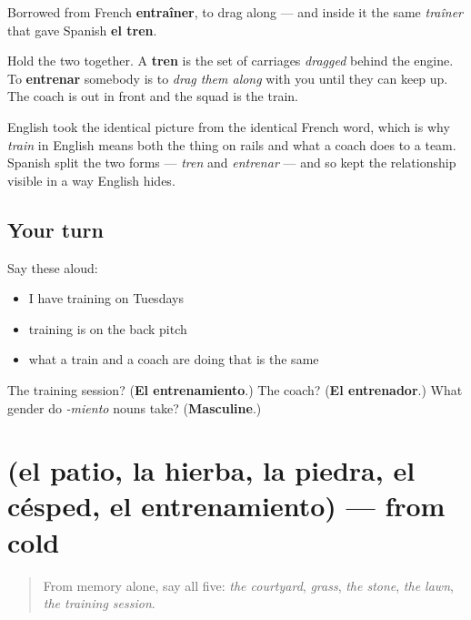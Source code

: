 \begin{cousinweb}
Borrowed from French \textbf{entraîner}, to drag along — and inside it the same \emph{traîner} that gave Spanish \textbf{el tren}.

Hold the two together. A \textbf{tren} is the set of carriages \emph{dragged} behind the engine. To \textbf{entrenar} somebody is to \emph{drag them along} with you until they can keep up. The coach is out in front and the squad is the train.

English took the identical picture from the identical French word, which is why \emph{train} in English means both the thing on rails and what a coach does to a team. Spanish split the two forms — \emph{tren} and \emph{entrenar} — and so kept the relationship visible in a way English hides.
\end{cousinweb}

\subsection*{Your turn}
Say these aloud:

\begin{itemize}
\raggedright
  \item I have training on Tuesdays
  \item training is on the back pitch
  \item what a train and a coach are doing that is the same
\end{itemize}

\begin{tcolorbox}[breakable,colback=teal!4,colframe=teal!35!black,title={Before you move on}]
The training session? (\textbf{El entrenamiento}.) The coach? (\textbf{El entrenador}.) What gender do \emph{-miento} nouns take? (\textbf{Masculine}.)
\end{tcolorbox}
\section[(el patio, la hierba, la piedra, el …]{(el patio, la hierba, la piedra, el césped, el entrenamiento) — from cold}

\label{lesson:ES-R450-repaso-suelo}



\begin{quote}
From memory alone, say all five: \emph{the courtyard}, \emph{grass}, \emph{the stone}, \emph{the lawn}, \emph{the training session}.
\end{quote}

